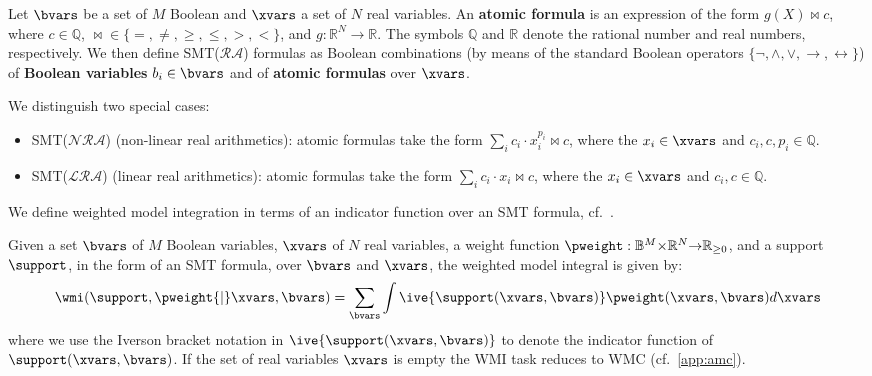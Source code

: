 \begin{definition} \label{def:smtra}
	Let $\bvars$ be a set of $M$ Boolean and $\xvars$ a set of $N$ real variables.
	An {\bf atomic formula} is an expression of the form $g(X) \bowtie c$, where $c \in \mathbb{Q}$, $\bowtie \in \{ =,\neq, \geq,\leq,>,< \}$, and  $g:\mathbb{R}^{N} \rightarrow \mathbb{R}$. The symbols $\mathbb{Q}$  and $\mathbb{R}$ denote the rational number and real numbers, respectively. 
	We then define SMT($\mathcal{RA}$) formulas as Boolean combinations (by means of the standard Boolean operators $\{\neg, \land, \lor, \rightarrow, \leftrightarrow \}$) of {\bf Boolean variables} $b_i \in \bvars$ and of {\bf atomic formulas} over $\xvars$.

	We distinguish two special cases:
	\begin{itemize}
		\item SMT($\mathcal{NRA}$) (non-linear real arithmetics): atomic formulas take the form $\sum_i c_i \cdot x_i^{p_i}\bowtie c$, where the $x_i \in \xvars$ and $c_i,c, p_i \in \mathbb{Q}$.  
		\item SMT($\mathcal{LRA}$) (linear real arithmetics): atomic formulas take the form $\sum_i c_i \cdot x_i \bowtie c$, where the $x_i \in \xvars$ and $c_i,c \in \mathbb{Q}$.
	\end{itemize}
\end{definition}

We define weighted model integration in terms of an indicator function over an SMT formula, cf.~\citep{kolb2019exploit}.
\begin{definition}[{\bf WMI}]\label{def:wmi}
Given a set $\bvars$ of $M$ Boolean variables,  $\xvars$ of $N$ real variables, a weight function $\pweight:
\mathbb{B}^M {\times} \mathbb{R}^N {\rightarrow} \mathbb{R}_{\geq 0}$, and a support $\support$, in the form of an SMT formula, over $\bvars$ and  $\xvars$, the weighted model integral is given by:
\begin{align}
  \wmi(\support, \pweight {\mid} \xvars, \bvars) = \sum_{\bvars} \int \ive{\support(\xvars, \bvars)} \pweight({\xvars},{\bvars}) d{\xvars} \label{eqn:def_wmi}
\end{align}
where we use the Iverson bracket notation in $\ive{\support(\xvars, \bvars)}$ to denote the indicator function of $\support(\xvars, \bvars)$. If the set of real variables $\xvars$ is empty the WMI task reduces to WMC (cf.~\ref{app:amc}).
\end{definition}

